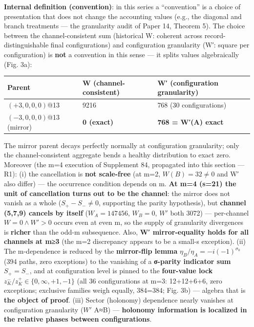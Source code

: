 \documentclass[
]{ltjsarticle}
\newcounter{none} %
\begin{document}
\textbf{Internal definition (convention)}: in this series a
``convention'' is a choice of presentation that does not change the
accounting values (e.g., the diagonal and branch treatments --- the
granularity audit of Paper 14, Theorem 5). The choice between the
channel-consistent sum (historical W: coherent across
record-distinguishable final configurations) and configuration
granularity (W′: square per configuration) is \textbf{not} a convention
in this sense --- it splits values algebraically (Fig. 3a):

{\def\LTcaptype{none} %
\begin{longtable}[]{@{}lll@{}}
\toprule\noalign{}
Parent & W (channel-consistent) & W′ (configuration granularity) \\
\midrule\noalign{}
\endhead
\bottomrule\noalign{}
\endlastfoot
\((+3,0,0,0)\)@13 & 9216 & 768 (30 configurations) \\
\((-3,0,0,0)\)@13 (mirror) & \textbf{0 (exact)} & \textbf{768 = W′(A)
exact} \\
\end{longtable}
}

The mirror parent decays perfectly normally at configuration
granularity; only the channel-consistent aggregate bends a healthy
distribution to exact zero. Moreover (the m=4 execution of Supplement
84, propagated into this section --- R1): (i) the cancellation is
\textbf{not scale-free} (at m=2, \(W(B)=32\neq0\) and W′ also differ)
--- the occurrence condition depends on m. \textbf{At m=4 (s=21) the
unit of cancellation turns out to be the channel}: the mirror does not
vanish as a whole (\(S_+-S_-\neq0\), supporting the parity hypothesis),
but \textbf{channel (5,7,9) cancels by itself} (\(W_A=147456\),
\(W_B=0\), \(W'\) both 3072) --- per-channel \(W=0\wedge W'>0\) occurs
even at even m, so the supply of granularity divergences is
\textbf{richer} than the odd-m subsequence. Also, \textbf{W′
mirror-equality holds for all channels at m≥3} (the m=2 discrepancy
appears to be a small-s exception). (ii) The m-dependence is reduced by
the \textbf{mirror-flip lemma} \(\eta_B/\eta_A=-i(-1)^{\sigma_0}\) (394
paths, zero exceptions) to the vanishing of a \textbf{σ-parity indicator
sum} \(S_+=S_-\), and at configuration level is pinned to the
\textbf{four-value lock} \(z^-_K/z^+_K\in\{0,\infty,+1,-1\}\) (all 36
configurations at m=3: 12+12+6+6, zero exceptions; exclusive families
weigh equally, 384=384; Fig. 3b) --- algebra that is \textbf{the object
of proof}. (iii) Sector (holonomy) dependence nearly vanishes at
configuration granularity (\(W'\) A≈B) --- \textbf{holonomy information
is localized in the relative phases between configurations}.
\end{document}
